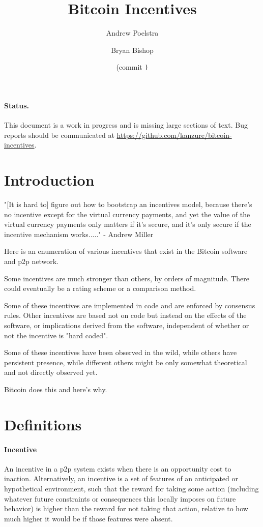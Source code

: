 \documentclass[letterpaper]{article}
\title{Bitcoin Incentives}
\author{Andrew Poelstra}
\author{Bryan Bishop}
\date{\gitAuthorDate{} (commit \texttt{\gitAbbrevHash)}}
\begin{document}
\maketitle

\paragraph{Status.} This document is a work in progress and is missing large
sections of text. Bug reports should be communicated at
\url{https://github.com/kanzure/bitcoin-incentives}.

\section{Introduction}

"[It is hard to] figure out how to bootstrap an incentives model, because
there's no incentive except for the virtual currency payments, and yet the
value of the virtual currency payments only matters if it's secure, and it's
only secure if the incentive mechanism works....." - Andrew Miller

Here is an enumeration of various incentives that exist in the Bitcoin software
and p2p network.

Some incentives are much stronger than others, by orders of magnitude. There
could eventually be a rating scheme or a comparison method.

Some of these incentives are implemented in code and are enforced by consensus
rules. Other incentives are based not on code but instead on the effects of the
software, or implications derived from the software, independent of whether or
not the incentive is "hard coded".

Some of these incentives have been observed in the wild, while others have
persistent presence, while different others might be only somewhat theoretical
and not directly observed yet.

Bitcoin does this and here's why.

\section{Definitions}

\paragraph{Incentive} An incentive in a p2p system exists when there is an
opportunity cost to inaction. Alternatively, an incentive is a set of features
of an anticipated or hypothetical environment, such that the reward for taking
some action (including whatever future constraints or consequences this locally
imposes on future behavior) is higher than the reward for not taking that
action, relative to how much higher it would be if those features were absent.
\end{document}

